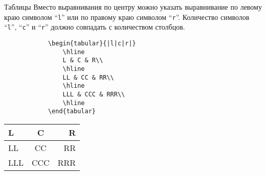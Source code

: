 \begin{frame}[fragile]{Таблицы}
	\small
	Вместо выравнивания по центру можно указать выравнивание по левому краю символом ``\texttt{l}'' или по правому краю символом ``\texttt{r}''. Количество символов ``\texttt{l}'', ``\texttt{c}'' и ``\texttt{r}'' должно совпадать с количеством столбцов.

	\begin{minipage}{0.49\textwidth}
		\begin{verbatim}
			\begin{tabular}{|l|c|r|}
				\hline
				L & C & R\\
				\hline
				LL & CC & RR\\
				\hline
				LLL & CCC & RRR\\
				\hline
			\end{tabular}
		\end{verbatim}
	\end{minipage}
	\begin{minipage}{0.49\textwidth}
		\begin{center}
			\begin{tabular}{|l|c|r|}
				\hline
				L & C & R\\
				\hline
				LL & CC & RR\\
				\hline
				LLL & CCC & RRR\\
				\hline
			\end{tabular}
		\end{center}
	\end{minipage}
\end{frame}

